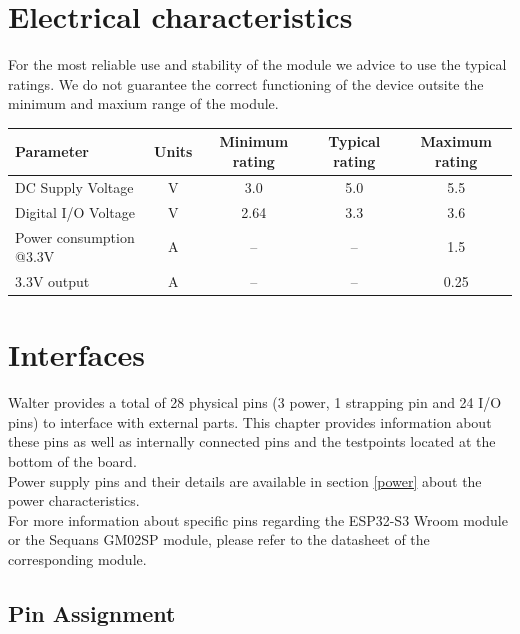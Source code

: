 \documentclass[11pt]{article}
\begin{document}
\section{Electrical characteristics}
For the most reliable use and stability of the module we advice to use the typical ratings. We do not guarantee the correct functioning of the device outsite the minimum and maxium range of the module. 
\begin{center}
\renewcommand{\arraystretch}{1.5}
\begin{tabular}{|p{5cm}|c|c|c|c|}
\hline
{\bf Parameter} & {\bf Units} & {\bf Minimum rating} & {\bf Typical rating} & {\bf Maximum rating} \\
\hline
\hline
DC Supply Voltage & V & 3.0 & 5.0 & 5.5 \\
\hline
Digital I/O Voltage & V & 2.64 & 3.3 & 3.6 \\
\hline
Power consumption @3.3V & A & -- & -- & 1.5 \\
\hline
3.3V output & A & -- & -- & 0.25 \\
\hline
\end{tabular}
\end{center}

\newpage
\section{Interfaces}
Walter provides a total of 28 physical pins (3 power, 1 strapping pin and 24 I/O pins) to interface with external parts. This chapter provides information about these pins as well as internally connected pins and the testpoints located at the bottom of the board.\\

Power supply pins and their details are available in section \ref{power} about the power characteristics.\\

For more information about specific pins regarding the ESP32-S3 Wroom module or the Sequans GM02SP module, please refer to the datasheet of the corresponding module.

\subsection{Pin Assignment} \label{pin_assigment}
\end{document}
